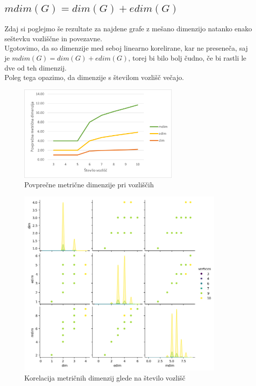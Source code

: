 \documentclass[a4paper,12pt]{article}
\theoremstyle{definition}
\theoremstyle{remark}
\theoremstyle{definition}
\begin{document}
\subsection{$mdim(G) = dim(G) + edim(G)$}
\vspace{0.5cm}

Zdaj si poglejmo še rezultate za najdene grafe z mešano dimenzijo
natanko enako seštevku vozliščne in povezavne.\\

\indent Ugotovimo, da so dimenzije med seboj linearno korelirane,
kar ne preseneča, saj je $mdim(G) = dim(G) + edim(G)$, torej bi bilo
bolj čudno, če bi rastli le dve od teh dimenzij.\\
\indent Poleg tega opazimo, da dimenzije s številom vozlišč večajo.

\begin{figure} 
    \centering
    \includegraphics[width=0.7\textwidth]{st_vozl_mean.png} 
    \caption{Povprečne metrične dimenzije pri vozliščih}
\end{figure}

\begin{figure}[H] 
    \centering
    \includegraphics[width=0.9\textwidth]{mdim_pairgraph.png} 
    \caption{Korelacija metričnih dimenzij glede na število vozlišč}
\end{figure}
\end{document}
